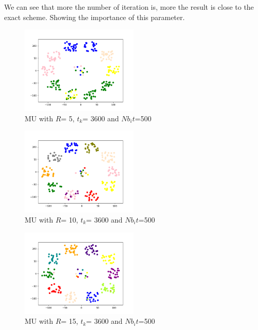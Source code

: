 \documentclass{article}
\begin{document}
We can see that more the number of iteration is, more the result is close to the exact scheme. Showing the importance of this parameter.\\

\begin{figure}[h]
    \centering
    \includegraphics[width=0.5\textwidth]{images/MU500_R5_t3600.png}
    \caption{MU with $R$= 5, $t_{k}$= 3600 and $Nb_it$=500}
\end{figure}

\begin{figure}[h]
    \centering
    \includegraphics[width=0.5\textwidth]{images/MU500_R10_t3600.png}
    \caption{MU with $R$= 10, $t_{k}$= 3600 and $Nb_it$=500}
\end{figure}

\begin{figure}[h]
    \centering
    \includegraphics[width=0.5\textwidth]{images/MU500_R15_t3600.png}
    \caption{MU with $R$= 15, $t_{k}$= 3600 and $Nb_it$=500}
\end{figure}
\end{document}
